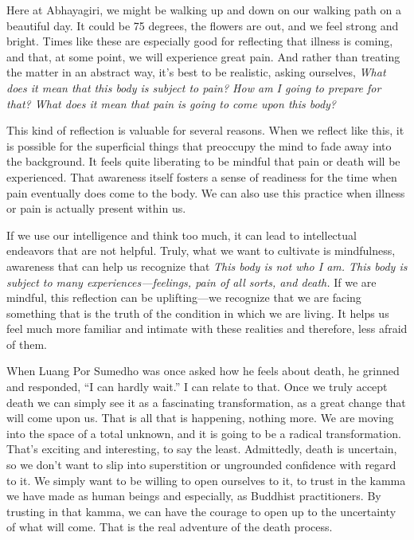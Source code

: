 Here at Abhayagiri, we might be walking up and down on our walking path 
on a beautiful day. It could be 75 degrees, the flowers are out, and we 
feel strong and bright. Times like these are especially good for 
reflecting that illness is coming, and that, at some point, we will 
experience great pain. And rather than treating the matter in an 
abstract way, it's best to be realistic, asking ourselves, \emph{What 
does it mean that this body is subject to pain? How am I going to 
prepare for that? What does it mean that pain is going to come upon 
this body?}

This kind of reflection is valuable for several reasons. When we 
reflect like this, it is possible for the superficial things that 
preoccupy the mind to fade away into the background. It feels quite 
liberating to be mindful that pain or death will be experienced. That 
awareness itself fosters a sense of readiness for the time when pain 
eventually does come to the body. We can also use this practice when 
illness or pain is actually present within us.

If we use our intelligence and think too much, it can lead to 
intellectual endeavors that are not helpful. Truly, what we want to 
cultivate is mindfulness, awareness that can help us recognize that 
\emph{This body is not who I am. This body is subject to many 
experiences---feelings, pain of all sorts, and death.} If we are 
mindful, this reflection can be uplifting---we recognize that we are 
facing something that is the truth of the condition in which we are 
living. It helps us feel much more familiar and intimate with these 
realities and therefore, less afraid of them.

When Luang Por Sumedho was once asked how he feels about death, he 
grinned and responded, ``I can hardly wait.'' I can relate to that. 
Once we truly accept death we can simply see it as a fascinating 
transformation, as a great change that will come upon us. That is all 
that is happening, nothing more. We are moving into the space of a 
total unknown, and it is going to be a radical transformation. That's 
exciting and interesting, to say the least. Admittedly, death is 
uncertain, so we don't want to slip into superstition or ungrounded 
confidence with regard to it. We simply want to be willing to open 
ourselves to it, to trust in the kamma we have made as human beings and 
especially, as Buddhist practitioners. By trusting in that kamma, we 
can have the courage to open up to the uncertainty of what will come. 
That is the real adventure of the death process.

